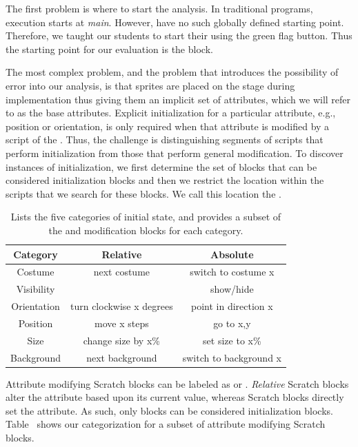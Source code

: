 The first problem is where to start the analysis.  In traditional programs,
execution starts at \emph{main}. However,  have no such globally
defined starting point. Therefore, we taught our students to start their
\sprogram{} using the green flag button. Thus the starting point for our
evaluation is the \greenflag{} block.

The most complex problem, and the problem that introduces the possibility of
error into our analysis, is that sprites are placed on the stage during
implementation thus giving them an implicit set of attributes, which we will
refer to as the base attributes. Explicit initialization for a particular
attribute, e.g., position or orientation, is only required when that attribute
is modified by a script of the \sprogram{}. Thus, the challenge is
distinguishing segments of scripts that perform initialization from those that
perform general modification. To discover instances of initialization, we first
determine the set of blocks that can be considered initialization blocks and
then we restrict the location within the scripts that we search for these
blocks. We call this location the \initzone{}.

\begin{table}
\centering
\begin{tabular}{|c|c|c|} \hline
Category & Relative&Absolute\\ \hline \hline
Costume& next costume & switch to costume x\\ \hline
Visibility& & show/hide\\ \hline
Orientation&turn clockwise x degrees&point in direction x\\ \hline
Position&move x steps & go to x,y\\ \hline
Size&change size by x\% & set size to x\%\\ \hline
Background&next background & switch to background x\\ \hline
\end{tabular}
\caption{Lists the five categories of initial state, and provides a subset of
  the \rel{} and \abs{} modification blocks for each category.}
\end{table}

Attribute modifying Scratch blocks can be labeled as \rel{} or
\abs{}. \emph{Relative} Scratch blocks alter the attribute based upon its
current value, whereas \abs{} Scratch blocks directly set the attribute. As
such, only \abs{} blocks can be considered initialization
blocks. Table~ shows our categorization for a
subset of attribute modifying Scratch blocks.

